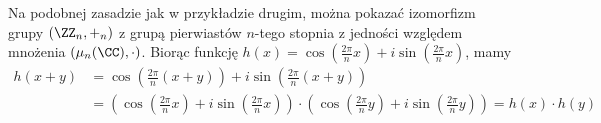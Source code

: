 Na podobnej zasadzie jak w przykładzie drugim, można pokazać izomorfizm grupy $(\ZZ_n, +_n)$ z grupą pierwiastów $n$-tego stopnia z jedności względem mnożenia $(\mu_n(\CC), \cdot)$. Biorąc funkcję $h(x) = \cos(\frac{2\pi}{n}x) + i\sin(\frac{2\pi}{n}x)$, mamy
\begin{align*} h(x + y) &= \cos(\tfrac{2\pi}{n}(x + y)) + i\sin(\tfrac{2\pi}{n}(x + y)) \\
    &= \left(\cos(\tfrac{2\pi}{n}x) + i\sin(\tfrac{2\pi}{n}x)\right) \cdot \left(\cos(\tfrac{2\pi}{n}y) + i\sin(\tfrac{2\pi}{n}y)\right) = h(x) \cdot h(y)\end{align*}
